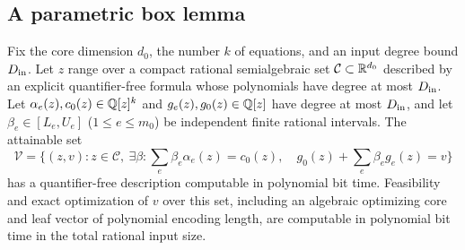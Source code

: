 \subsection{A parametric box lemma}
\begin{lemma}
\label{lem:a-blk-boxlp}
Fix the core dimension $d_0$, the number $k$ of equations, and an input
degree bound $D_{\rm in}$. Let $z$ range over a compact rational semialgebraic
set $\mathcal C\subset\mathbb{R}^{d_0}$ described by an explicit quantifier-free
formula whose polynomials have degree at most $D_{\rm in}$. Let $\alpha_e(z),c_0(z)\in\mathbb{Q}[z]^k$ and
$g_e(z),g_0(z)\in\mathbb{Q}[z]$ have degree at most $D_{\rm in}$, and let
$\beta_e\in[L_e,U_e]$ ($1\le e\le m_0$) be independent finite rational intervals.
The attainable set
\[
 \mathcal V=\{(z,v):z\in\mathcal C,\ \exists\beta:
    \sum_e\beta_e \alpha_e(z)=c_0(z),\quad
    g_0(z)+\sum_e\beta_e g_e(z)=v\}
\]
has a quantifier-free description computable in polynomial bit time.
Feasibility and exact optimization of $v$ over this set, including an
algebraic optimizing core and leaf vector of polynomial encoding length,
are computable in polynomial bit time in the total rational input size.
\end{lemma}
